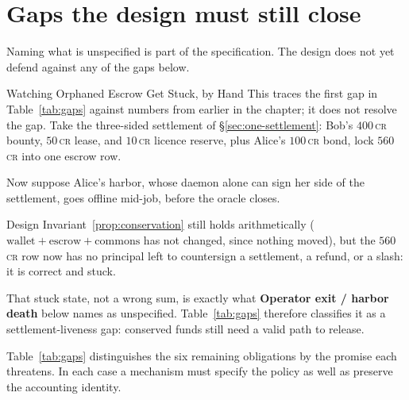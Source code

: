 \documentclass[11pt,a4paper]{article}
\theoremstyle{definition}
\theoremstyle{definition}
\theoremstyle{remark}
\begin{document}
\section{Gaps the design must still close}\label{sec:gaps}

Naming what is unspecified is part of the specification. The design does not
yet defend against any of the gaps below.

\begin{pdexample}{Watching Orphaned Escrow Get Stuck, by Hand}
\setlength{\parskip}{4pt plus 1pt}
This traces the first gap in Table~\ref{tab:gaps} against numbers from
earlier in the chapter; it does not resolve the gap. Take
the three-sided settlement of \S\ref{sec:one-settlement}: Bob's $400$\,\textsc{cr}
bounty, $50$\,\textsc{cr} lease, and $10$\,\textsc{cr} licence reserve, plus
Alice's $100$\,\textsc{cr} bond, lock $560$\,\textsc{cr} into one escrow row.

Now suppose Alice's harbor, whose daemon alone can sign her side of the
settlement, goes offline mid-job, before the oracle closes.

Design
Invariant~\ref{prop:conservation} still holds arithmetically
($\text{wallet}+\text{escrow}+\text{commons}$ has not changed, since nothing
moved), but the $560$\,\textsc{cr} row now has no principal left to countersign
a settlement, a refund, or a slash: it is correct and stuck.

That stuck state,
not a wrong sum, is exactly what \textbf{Operator exit / harbor death} below
names as unspecified. Table~\ref{tab:gaps} therefore classifies it as a
settlement-liveness gap: conserved funds still need a valid path to release.
\end{pdexample}

Table~\ref{tab:gaps} distinguishes the six remaining obligations by the
promise each threatens. In each case a mechanism must specify the policy as
well as preserve the accounting identity.
\end{document}
